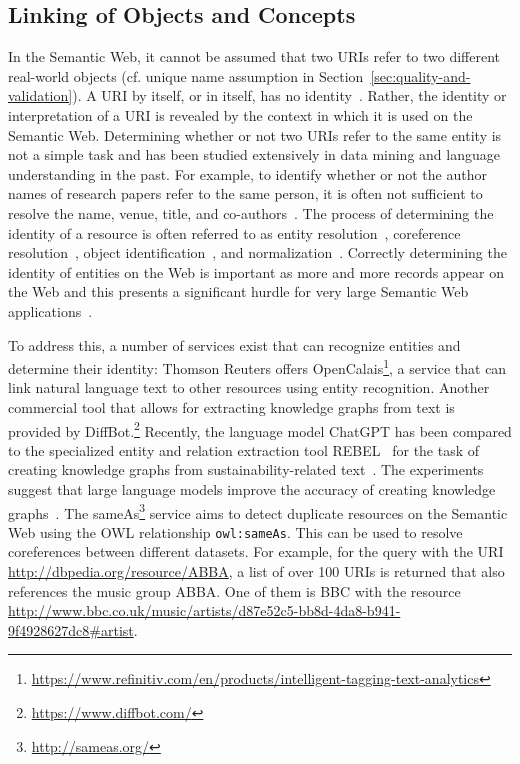 \documentclass[a4paper,USenglish]{tgdk-v2021}
\newcommand{\concept}[1]{\texttt{#1}}
\newcommand{\myurl}[1]{\footnote{\url{#1}}}
\begin{document}
\subsection{Linking of Objects and Concepts}
\label{sec:identity}

In the Semantic Web, it cannot be assumed that two URIs refer to two different real-world objects (cf. unique name assumption in Section~\ref{sec:quality-and-validation}).
A URI by itself, or in itself, has no identity~\cite{HalpinP09}.
Rather, the identity or interpretation of a URI is revealed by the context in which it is used on the Semantic Web.
Determining whether or not two URIs refer to the same entity is not a simple task and has been studied extensively in data mining and language understanding in the past.
For example, to identify whether or not the author names of research papers refer to the same person, it is often not sufficient to resolve the name, venue, title, and co-authors~\cite{PallikaEtAlCoreference2007}.
The process of determining the identity of a resource is often referred to as entity resolution~\cite{PallikaEtAlCoreference2007}, coreference resolution~\cite{WickEtAlCoreference}, object identification~\cite{RendleS06}, and normalization~\cite{WickEtAlCoreference,WickKDD2008}.
Correctly determining the identity of entities on the Web is important as more and more records appear on the Web and this presents a significant hurdle for very large Semantic Web applications~\cite{GlaserLOD2009}.

To address this, a number of services exist that can recognize entities and determine their identity:
Thomson Reuters offers OpenCalais\myurl{https://www.refinitiv.com/en/products/intelligent-tagging-text-analytics}, a service that can link natural language text to other resources using entity recognition. 
Another commercial tool that allows for extracting knowledge graphs from text is provided by DiffBot.\myurl{https://www.diffbot.com/}
Recently, the language model ChatGPT has been compared to the specialized entity and relation extraction tool REBEL~\cite{DBLP:conf/emnlp/CabotN21} for the task of creating knowledge graphs from sustainability-related text~\cite{DBLP:journals/corr/abs-2305-04676}.
The experiments suggest that large language models improve the accuracy of creating knowledge graphs~\cite{DBLP:journals/corr/abs-2305-04676}.
The sameAs\myurl{http://sameas.org/} service aims to detect duplicate resources on the Semantic Web using the OWL relationship \concept{owl:sameAs}.
This can be used to resolve coreferences between different datasets.
For example, for the query with the URI \url{http://dbpedia.org/resource/ABBA}, a list of over 100 URIs is returned that also references the music group ABBA.
One of them is BBC with the resource \url{http://www.bbc.co.uk/music/artists/d87e52c5-bb8d-4da8-b941-9f4928627dc8#artist}.
\end{document}
